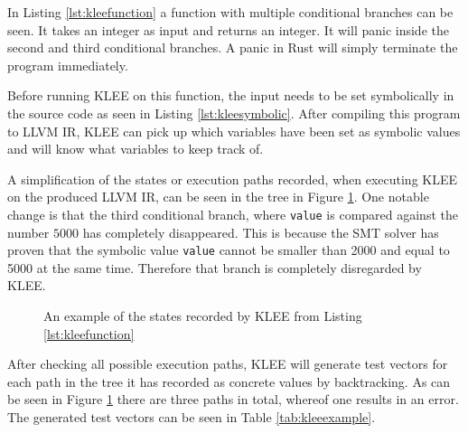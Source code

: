 In Listing \ref{lst:kleefunction} a function with multiple conditional branches
can be seen. It takes an integer as input and returns an integer.  It will
panic inside the second and third conditional branches. A panic in Rust will
simply terminate the program immediately.


Before running KLEE on this function, the input needs to be set symbolically in
the source code as seen in Listing \ref{lst:kleesymbolic}. After compiling this
program to LLVM IR, KLEE can pick up which variables have been set as symbolic
values and will know what variables to keep track of.


A simplification of the states or execution paths recorded, when executing KLEE
on the produced LLVM IR, can be seen in the tree in Figure
\ref{figure:kleetree}.  One notable change is that the third conditional
branch, where \texttt{value} is compared against the number $5000$ has
completely disappeared. This is because the SMT solver has proven that the
symbolic value \texttt{value} cannot be smaller than 2000 and equal to 5000 at
the same time.  Therefore that branch is completely disregarded by KLEE.
\begin{figure}[h]
    \centering
    \caption{An example of the states recorded by KLEE from Listing \ref{lst:kleefunction}}
    \label{figure:kleetree}
\end{figure}
After checking all possible execution paths, KLEE will generate test vectors
for each path in the tree it has recorded as concrete values by backtracking.
As can be seen in Figure \ref{figure:kleetree} there are three paths in total,
whereof one results in an error. The generated test vectors can be seen in Table
\ref{tab:kleeexample}.

